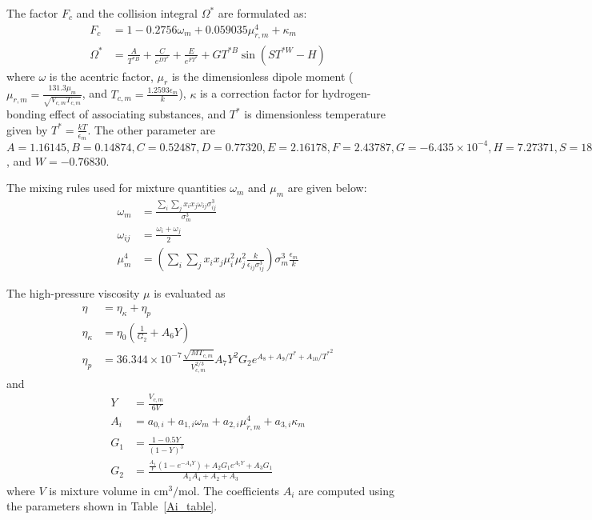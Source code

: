 The factor $F_c$ and the collision integral $\Omega^*$ are formulated as:
\begin{align}
	F_c      & = 1-0.2756\omega_m +0.059035 \mu_{r,m}^4+\kappa_m                                       \\
	\Omega^* & =\frac{A}{T^{*B}} +\frac{C}{e^{D T^*}} + \frac{E}{e^{F T^*}} +G T^{*B} \sin(ST^{*W} -H)
\end{align}
where $\omega$ is the acentric factor, $\mu_r$ is the dimensionless dipole moment ($\mu_{r,m} = \frac{131.3 \mu_m}{\sqrt{V_{c,m}T_{c,m}}}$, and $T_{c,m} =\frac{1.2593 \epsilon_m}{k}$), $\kappa$ is a correction factor for hydrogen-bonding effect of associating substances, and $T^*$ is dimensionless temperature given by $T^* = \frac{kT}{\epsilon_m}$. The other parameter are $A = 1.16145, B = 0.14874, C = 0.52487, D = 0.77320, E = 2.16178, F = 2.43787, G = -6.435\times 10^{-4}, H = 7.273 71, S = 18.0323$, and $W = -0.768 30$.

The mixing rules used for mixture quantities $\omega_m$ and $\mu_m$ are given below:
\begin{align}
	\omega_m    & = \frac{\sum_i\sum_j x_ix_j \omega_{ij}\sigma_{ij}^3}{\sigma_m^3}                                                            \\
	\omega_{ij} & = \frac{\omega_i+\omega_j}{2}                                                                                                \\
	\mu_m^4     & = \left(\sum_i\sum_j x_i x_j \mu_{i}^2 \mu_{j}^2  \frac{k}{\epsilon_{ij}\sigma_{ij}^3}\right) \sigma_m^3\frac{\epsilon_m}{k}
\end{align}

The high-pressure viscosity $\mu$ is evaluated as
\begin{align}
	\eta          & = \eta_{\kappa} +\eta_p                                                                              \\
	\eta_{\kappa} & = \eta_0 \left( \frac{1}{G_2}+A_6 Y \right)                                                          \\
	\eta_p        & = 36.344\times 10^{-7}\frac{\sqrt{M T_{c,m}}}{V_{c,m}^{2/3}}A_7Y^2G_2 e^{A_8+A_9/T^*+A_{10}/{T^*}^2}
\end{align}
and
\begin{align}
	Y     & = \frac{V_{c,m}}{6V}                                                                          \\
	A_{i} & = a_{0,i} + a_{1,i}\omega_m + a_{2,i} \mu_{r,m}^4 + a_{3,i} \kappa_m                          \\
	G_1   & = \frac{1-0.5 Y }{(1-Y)^3}                                                                    \\
	G_2   & =\frac{ \frac{A_1}{Y} \left(1- e^{-A_4 Y}\right)+ A_2 G_1 e^{A_5 Y}+A_3 G_1 }{A_1A_4+A_2+A_3}
\end{align}
where $V$ is mixture volume in $\text{cm}^3/\text{mol}$. The coefficients $A_i$ are
computed using the parameters shown in Table~\ref{Ai_table}.


